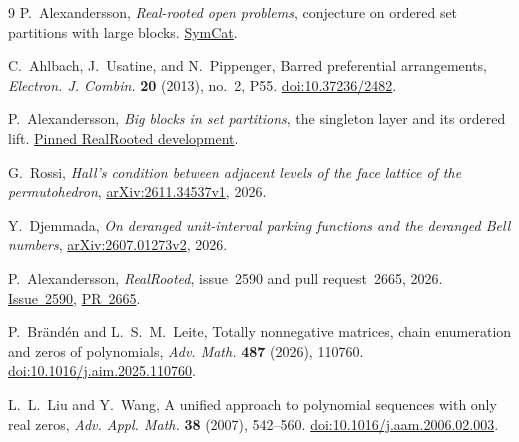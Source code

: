 \documentclass[11pt]{article}
\begin{document}
\begin{thebibliography}{9}
P.~Alexandersson, \emph{Real-rooted open problems}, conjecture on ordered set partitions with large blocks.
\href{https://www.symmetricfunctions.com/realRootedOpenProblems.htm\#set-partitions-and-trees}{SymCat}.

C.~Ahlbach, J.~Usatine, and N.~Pippenger, Barred preferential arrangements,
\emph{Electron. J. Combin.} \textbf{20} (2013), no.~2, P55.
\href{https://doi.org/10.37236/2482}{doi:10.37236/2482}.

P.~Alexandersson, \emph{Big blocks in set partitions}, the singleton layer and its
ordered lift. \href{https://github.com/PerAlexandersson/RealRooted/blob/d34c13585e69912d443ecb973d9b78733dd9a052/RealRooted/CombinatorialExamples/BigBlockSingletons.lean}{Pinned RealRooted development}.

G.~Rossi, \emph{Hall's condition between adjacent levels of the face lattice of the permutohedron},
\href{https://arxiv.org/abs/2611.34537v1}{arXiv:2611.34537v1}, 2026.

Y.~Djemmada, \emph{On deranged unit-interval parking functions and the deranged Bell numbers},
\href{https://arxiv.org/abs/2607.01273v2}{arXiv:2607.01273v2}, 2026.

P.~Alexandersson, \emph{RealRooted}, issue~2590 and pull request~2665, 2026.
\href{https://github.com/PerAlexandersson/RealRooted/issues/2590}{Issue~2590},
\href{https://github.com/PerAlexandersson/RealRooted/pull/2665}{PR~2665}.

P.~Br\"and\'en and L.~S.~M.~Leite, Totally nonnegative matrices, chain enumeration and zeros of polynomials,
\emph{Adv. Math.} \textbf{487} (2026), 110760.
\href{https://doi.org/10.1016/j.aim.2025.110760}{doi:10.1016/j.aim.2025.110760}.

L.~L.~Liu and Y.~Wang, A unified approach to polynomial sequences with only real zeros,
\emph{Adv. Appl. Math.} \textbf{38} (2007), 542--560.
\href{https://doi.org/10.1016/j.aam.2006.02.003}{doi:10.1016/j.aam.2006.02.003}.
\end{thebibliography}
\end{document}
